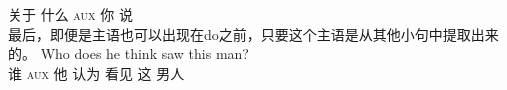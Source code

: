      关于 什么 \textsc{aux} 你 说\\ 
\zl
最后，即便是主语也可以出现在do之前，只要这个主语是从其他小句中提取出来的。
\ea
\settowidth{}
\gll Who does he think saw this man?\\   
     谁 \textsc{aux} 他 认为 看见 这 男人\\
\z
%
%

